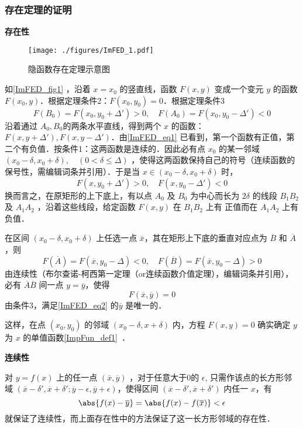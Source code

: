 \subsubsection{存在定理的证明}
\textbf{存在性}
\begin{figure}[ht]
\centering
\texttt{[image: ./figures/ImFED\_1.pdf]}
\caption{隐函数存在定理示意图} \label{ImFED_fig1}
\end{figure}
如\autoref{ImFED_fig1} ，沿着 $x=x_0$ 的竖直线，函数 $F(x,y)$ 变成一个变元 $y$ 的函数 $F(x_0,y)$．根据定理条件2：$F(x_0,y_0)=0$．根据定理条件3
\begin{equation}\label{ImFED_eq1}
F(B_0)=F(x_0,y_0+\Delta')>0,\quad F(A_0)=F(x_0,y_0-\Delta')<0
\end{equation}
沿着通过 $A_0,B_0$的两条水平直线，得到两个 $x$ 的函数：$F(x,y+\Delta'),F(x,y-\Delta')$．由\autoref{ImFED_eq1} 已看到，第一个函数有正值，第二个有负值．按条件1：这两函数是连续的．因此必有点 $x_0$ 的某一邻域 $(x_0-\delta,x_0+\delta),\quad(0<\delta\leq\Delta)$ ，使得这两函数保持自己的符号（连续函数的保号性，需编辑词条并引用）．于是当 $x\in(x_0-\delta,x_0+\delta)$ 时，
\begin{equation}
F(x,y_0+\Delta')>0,\quad F(x,y_0-\Delta')<0
\end{equation}
换而言之，在原矩形的上下底上，有以点 $A_0$ 及 $B_0$ 为中心而长为 $2\delta$ 的线段  $B_1B_2$ 及 $A_1A_2$ ，沿着这些线段，给定函数 $F(x,y)$ 在 $B_1B_2$ 上有 正值而在 $A_1A_2$ 上有负值．

在区间 $(x_0-\delta,x_0+\delta)$ 上任选一点 $\overline{x}$，其在矩形上下底的垂直对应点为 $\overline{B}$ 和 $\overline{A}$，则
\begin{equation}
F(\overline{A})=F(\overline{x},y_0-\Delta)<0,\quad F(\overline{B})=F(\overline{x},y_0-\Delta)>0
\end{equation}
由连续性（布尔查诺-柯西第一定理（or连续函数介值定理），编辑词条并引用），必有 $\overline{A}\overline{B}$ 间一点 $y=\overline{y}$，使得
\begin{equation}\label{ImFED_eq2}
F(\overline{x},\overline{y})=0
\end{equation}
由条件3，满足\autoref{ImFED_eq2} 的$\overline{y}$ 是唯一的．

这样，在点 $(x_0,y_0)$ 的邻域 $(x_0-\delta,x+\delta)$ 内，方程 $F(x,y)=0$ 确实确定 $y$ 为 $x$ 的单值函数\autoref{ImpFun_def1}~．

\textbf{连续性}

对 $y=f(x)$ 上的任一点 $(\overline{x},\overline{y})$ ，对于任意大于0的 $\epsilon$, 只需作该点的长方形邻域 $(\overline{x}-\delta',\overline{x}+\delta';\overline{y}-\epsilon,\overline{y}+\epsilon)$，使得区间 $(\overline{x}-\delta',\overline{x}+\delta')$ 内任一 $x$，有
\begin{equation}
\abs{f(x)-\overline{y}}=\abs{f(x)-f(\overline{x})}<\epsilon
\end{equation}
就保证了连续性，而上面存在性中的方法保证了这一长方形邻域的存在性．

